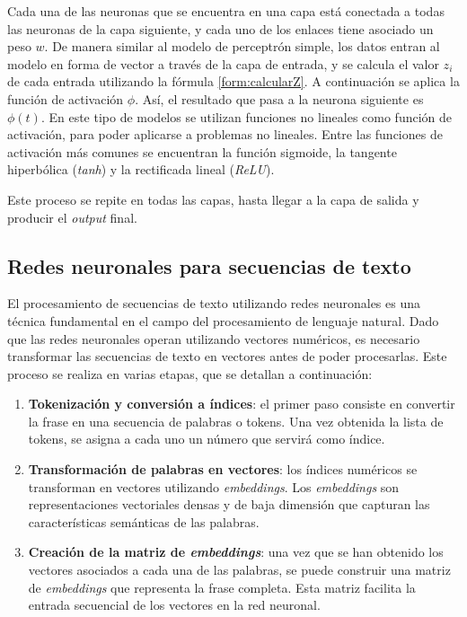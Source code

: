 \documentclass[11pt,spanish,listoffigures,listoftables]{tfgetsinf}
\begin{document}
Cada una de las neuronas que se encuentra en una capa está conectada a todas las neuronas de la capa siguiente, y cada uno de los enlaces tiene asociado un peso $w$. De manera similar al modelo de perceptrón simple, los datos entran al modelo en forma de vector a través de la capa de entrada, y se calcula el valor $z_i$ de cada entrada utilizando la fórmula \ref{form:calcularZ}. A continuación se aplica la función de activación $\phi$. Así, el resultado que pasa a la neurona siguiente es $\phi(t)$. En este tipo de modelos se utilizan funciones no lineales como función de activación, para poder aplicarse a problemas no lineales. Entre las funciones de activación más comunes se encuentran la función sigmoide, la tangente hiperbólica (\textit{tanh}) y la rectificada lineal (\textit{ReLU}).

Este proceso se repite en todas las capas, hasta llegar a la capa de salida y producir el \textit{output} final.

\subsection{Redes neuronales para secuencias de texto}



El procesamiento de secuencias de texto utilizando redes neuronales es una técnica fundamental en el campo del procesamiento de lenguaje natural. Dado que las redes neuronales operan utilizando vectores numéricos, es necesario transformar las secuencias de texto en vectores antes de poder procesarlas. Este proceso se realiza en varias etapas, que se detallan a continuación:

\begin{enumerate}
	\item \textbf{Tokenización y conversión a índices}: el primer paso consiste en convertir la frase en una secuencia de palabras o tokens. Una vez obtenida la lista de tokens, se asigna a cada uno un número que servirá como índice.
	\item \textbf{Transformación de palabras en vectores}: los índices numéricos se transforman en vectores utilizando \textit{embeddings}. Los \textit{embeddings} son representaciones vectoriales densas y de baja dimensión que capturan las características semánticas de las palabras.
	\item \textbf{Creación de la matriz de \textit{embeddings}}: una vez que se han obtenido los vectores asociados a cada una de las palabras, se puede construir una matriz de \textit{embeddings} que representa la frase completa. Esta matriz facilita la entrada secuencial de los vectores en la red neuronal.
\end{enumerate}
\end{document}
